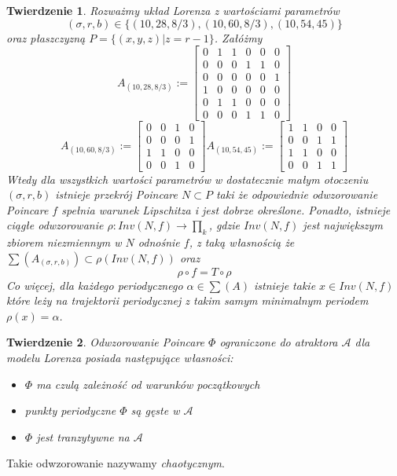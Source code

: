 \documentclass[12pt]{report}
\newtheorem{theorem}{Twierdzenie}
\begin{document}
	\begin{theorem}
		Rozważmy układ Lorenza z wartościami parametrów
			\[ (\sigma, r, b) \in \{(10, 28, 8/3), (10, 60, 8/3), (10, 54, 45)\} \]
		oraz płaszczyzną $P = \{(x, y, z) | z = r - 1\}$. Załóżmy
			\[ A_{(10,28,8/3)} := \begin{bmatrix}
									0 & 1 & 1 & 0 & 0 & 0 \\
									0 & 0 & 0 & 1 & 1 & 0 \\
									0 & 0 & 0 & 0 & 0 & 1 \\
									1 & 0 & 0 & 0 & 0 & 0 \\
									0 & 1 & 1 & 0 & 0 & 0 \\
									0 & 0 & 0 & 1 & 1 & 0
								\end{bmatrix}
			\]
			\[
			   A_{(10,60,8/3)} := \begin{bmatrix}
			   						0 & 0 & 1 & 0 \\
			   						0 & 0 & 0 & 1 \\
			   						1 & 1 & 0 & 0 \\
			   						0 & 0 & 1 & 0
			   					\end{bmatrix}
			   A_{(10,54,45)} := \begin{bmatrix}
			   						1 & 1 & 0 & 0 \\
			   						0 & 0 & 1 & 1 \\
			   						1 & 1 & 0 & 0 \\
			   						0 & 0 & 1 & 1
			   					\end{bmatrix}
			\]
		Wtedy dla wszystkich wartości parametrów w dostatecznie małym otoczeniu $(\sigma, r, b)$ istnieje przekrój Poincare $N \subset P$ taki że odpowiednie odwzorowanie Poincare $f$ spełnia warunek Lipschitza i jest dobrze określone. Ponadto, istnieje ciągłe odwzorowanie $\rho : Inv(N, f) \to \prod_k$, gdzie $Inv(N, f)$ jest największym zbiorem niezmiennym w $N$ odnośnie $f$, z taką własnością że $\sum (A_{(\sigma, r, b)}) \subset \rho (Inv(N, f))$ oraz
			\[ \rho \circ f = T \circ \rho \]
		Co więcej, dla każdego periodycznego $\alpha \in \sum (A)$ istnieje takie $x \in Inv(N, f)$ które leży na trajektorii periodycznej z takim samym minimalnym periodem $\rho(x) = \alpha$. \cite{MMS}
	\end{theorem}

	\begin{theorem}
		Odwzorowanie Poincare $\Phi$ ograniczone do atraktora $\mathcal{A}$ dla modelu Lorenza posiada następujące własności:
		\begin{itemize}
			\item $\Phi$ ma czulą zależność od warunków początkowych
			\item punkty periodyczne $\Phi$ są gęste w $\mathcal{A}$
			\item $\Phi$ jest tranzytywne na $\mathcal{A}$
		\end{itemize}
	\end{theorem}
	Takie odwzorowanie nazywamy \textit{chaotycznym}.
\end{document}

